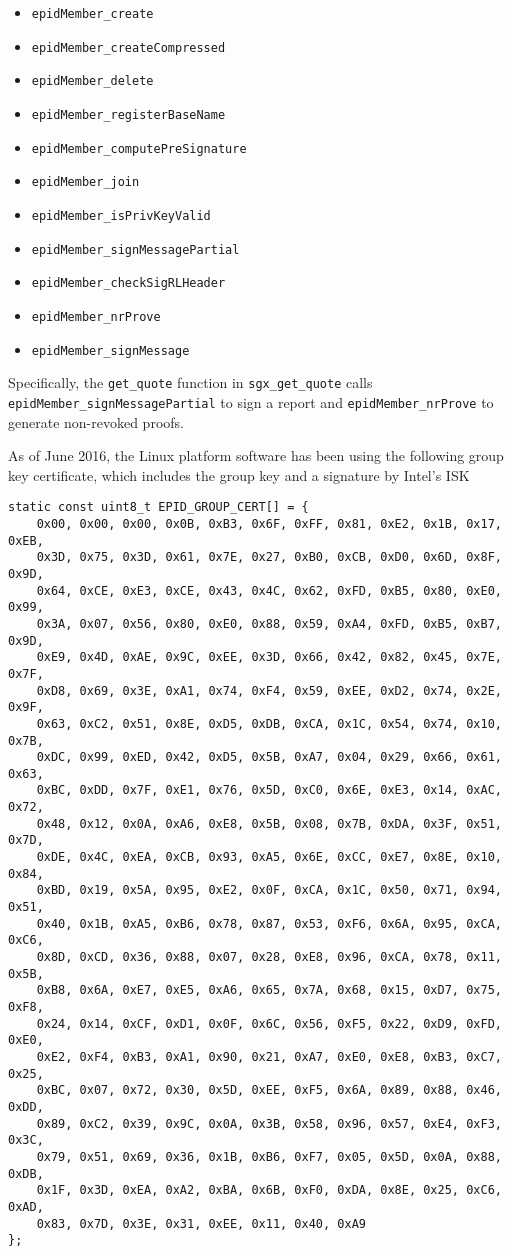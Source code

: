 \documentclass[]{article}
\providecommand{\tightlist}{%
  \setlength{\itemsep}{0pt}\setlength{\parskip}{0pt}}
\begin{document}
\begin{itemize}
\tightlist
\item
  \texttt{epidMember\_create}
\item
  \texttt{epidMember\_createCompressed}
\item
  \texttt{epidMember\_delete}
\item
  \texttt{epidMember\_registerBaseName}
\item
  \texttt{epidMember\_computePreSignature}
\item
  \texttt{epidMember\_join}
\item
  \texttt{epidMember\_isPrivKeyValid}
\item
  \texttt{epidMember\_signMessagePartial}
\item
  \texttt{epidMember\_checkSigRLHeader}
\item
  \texttt{epidMember\_nrProve}
\item
  \texttt{epidMember\_signMessage}
\end{itemize}

Specifically, the \texttt{get\_quote} function in
\texttt{sgx\_get\_quote} calls \texttt{epidMember\_signMessagePartial}
to sign a report and \texttt{epidMember\_nrProve} to generate
non-revoked proofs.

As of June 2016, the Linux platform software has been using the
following group key certificate, which includes the group key and a
signature by Intel's ISK

\begin{verbatim}
static const uint8_t EPID_GROUP_CERT[] = {
    0x00, 0x00, 0x00, 0x0B, 0xB3, 0x6F, 0xFF, 0x81, 0xE2, 0x1B, 0x17, 0xEB,
    0x3D, 0x75, 0x3D, 0x61, 0x7E, 0x27, 0xB0, 0xCB, 0xD0, 0x6D, 0x8F, 0x9D,
    0x64, 0xCE, 0xE3, 0xCE, 0x43, 0x4C, 0x62, 0xFD, 0xB5, 0x80, 0xE0, 0x99,
    0x3A, 0x07, 0x56, 0x80, 0xE0, 0x88, 0x59, 0xA4, 0xFD, 0xB5, 0xB7, 0x9D,
    0xE9, 0x4D, 0xAE, 0x9C, 0xEE, 0x3D, 0x66, 0x42, 0x82, 0x45, 0x7E, 0x7F,
    0xD8, 0x69, 0x3E, 0xA1, 0x74, 0xF4, 0x59, 0xEE, 0xD2, 0x74, 0x2E, 0x9F,
    0x63, 0xC2, 0x51, 0x8E, 0xD5, 0xDB, 0xCA, 0x1C, 0x54, 0x74, 0x10, 0x7B,
    0xDC, 0x99, 0xED, 0x42, 0xD5, 0x5B, 0xA7, 0x04, 0x29, 0x66, 0x61, 0x63,
    0xBC, 0xDD, 0x7F, 0xE1, 0x76, 0x5D, 0xC0, 0x6E, 0xE3, 0x14, 0xAC, 0x72,
    0x48, 0x12, 0x0A, 0xA6, 0xE8, 0x5B, 0x08, 0x7B, 0xDA, 0x3F, 0x51, 0x7D,
    0xDE, 0x4C, 0xEA, 0xCB, 0x93, 0xA5, 0x6E, 0xCC, 0xE7, 0x8E, 0x10, 0x84,
    0xBD, 0x19, 0x5A, 0x95, 0xE2, 0x0F, 0xCA, 0x1C, 0x50, 0x71, 0x94, 0x51,
    0x40, 0x1B, 0xA5, 0xB6, 0x78, 0x87, 0x53, 0xF6, 0x6A, 0x95, 0xCA, 0xC6,
    0x8D, 0xCD, 0x36, 0x88, 0x07, 0x28, 0xE8, 0x96, 0xCA, 0x78, 0x11, 0x5B,
    0xB8, 0x6A, 0xE7, 0xE5, 0xA6, 0x65, 0x7A, 0x68, 0x15, 0xD7, 0x75, 0xF8,
    0x24, 0x14, 0xCF, 0xD1, 0x0F, 0x6C, 0x56, 0xF5, 0x22, 0xD9, 0xFD, 0xE0,
    0xE2, 0xF4, 0xB3, 0xA1, 0x90, 0x21, 0xA7, 0xE0, 0xE8, 0xB3, 0xC7, 0x25,
    0xBC, 0x07, 0x72, 0x30, 0x5D, 0xEE, 0xF5, 0x6A, 0x89, 0x88, 0x46, 0xDD,
    0x89, 0xC2, 0x39, 0x9C, 0x0A, 0x3B, 0x58, 0x96, 0x57, 0xE4, 0xF3, 0x3C,
    0x79, 0x51, 0x69, 0x36, 0x1B, 0xB6, 0xF7, 0x05, 0x5D, 0x0A, 0x88, 0xDB,
    0x1F, 0x3D, 0xEA, 0xA2, 0xBA, 0x6B, 0xF0, 0xDA, 0x8E, 0x25, 0xC6, 0xAD,
    0x83, 0x7D, 0x3E, 0x31, 0xEE, 0x11, 0x40, 0xA9
};
\end{verbatim}
\end{document}

